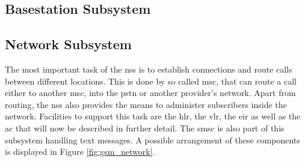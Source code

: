 \begin{table}
\centering
{}
\hspace{1cm}
\caption{Mobile Country and Network Codes. (R) denotes that the MCC is reserved but not operational as of yet, whereas (T) denotes a operational test network.}
\label{tab:countrycodes}
\end{table}

\subsection{Basestation Subsystem}
\label{sec:bss}
\subsection{Network Subsystem}
\label{sec:nss}
The most important task of the \gls{nss} is to establish connections and route calls between different locations.
This is done by so called \gls{msc}, that can route a call either to another \gls{msc}, into the \gls{pstn} or another provider's network.
Apart from routing, the \gls{nss} also provides the means to administer subscribers inside the network.
Facilities to support this task are the \gls{hlr}, the \gls{vlr}, the \gls{eir} as well as the \gls{ac} that will now be described in further detail.
The \gls{smsc} is also part of this subsystem handling text messages.
A possible arrangement of these components is displayed in Figure \ref{fig:gsm_network}.

